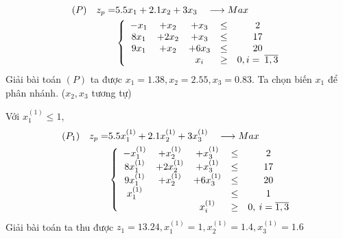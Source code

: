 \documentclass[12pt,a4paper]{report}
\begin{document}
    \begin{equation*}
    \begin{split}
    (P) \quad z_p= & 5.5x_1 + 2.1x_2 + 3x_3 \quad \longrightarrow Max \\
    & \left\{\begin{array} {ccccc}
     -x_1 &+ x_2 &+ x_3 &\leq& 2 \\
     8x_1 &+ 2x_2 &+ x_3&\leq& 17 \\
     9x_1 &+ x_2 &+ 6x_3 &\leq& 20 \\
    &&x_i &\geq& 0 , i = \: \overline{\rm 1,3} \\
    \end{array}\right. \\
    \end{split}
    \end{equation*}
    Giải bài toán $(P)$ ta được $x_1=1.38, x_2=2.55, x_3=0.83$. Ta chọn biến $x_1$ để phân nhánh. ($x_2, x_3$ tương tự)
    
    Với $x^{(1)}_1 \leq 1$, \\ 
    \begin{equation*}
    \begin{split}
      (P_1) \quad z_p= & 5.5x^{(1)}_1 + 2.1x^{(1)}_2 + 3x^{(1)}_3 \quad \longrightarrow Max \\
      & \left\{\begin{array} {ccccc}
       -x^{(1)}_1 &+ x^{(1)}_2 &+ x^{(1)}_3 &\leq& 2 \\
       8x^{(1)}_1 &+ 2x^{(1)}_2 &+ x^{(1)}_3&\leq& 17 \\
       9x^{(1)}_1 &+ x^{(1)}_2 &+ 6x^{(1)}_3 &\leq& 20 \\
       x^{(1)}_1 &&&\leq &1 \\
      &&x^{(1)}_i &\geq& 0 , \: i=\overline{\rm 1 ,3} \\
      \end{array}\right. \\
    \end{split}
    \end{equation*}
    Giải bài toán ta thu được $z_1=13.24, x^{(1)}_1=1, x^{(1)}_2=1.4, x^{(1)}_3=1.6$
    
    
    
\end{document}
